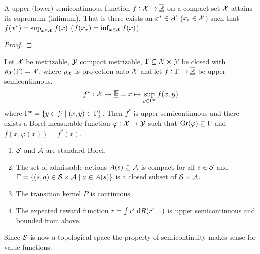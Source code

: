 \begin{prop}
  A upper (lower) semicontinuous function $f: \mathcal{X} \to \overline{\underline{\mathbb{R}}}$ on a compact
  set $\mathcal{X}$ attains its
  supremum (infimum). That is there exists an $x^* \in \mathcal{X}$ 
  ($x_* \in \mathcal{X}$) such that
  $f(x^*) = \sup_{x \in \mathcal{X}} f(x)$
  ($f(x_*) = \inf_{x \in \mathcal{X}} f(x)$).
  \label{prop:supSemiC}
\end{prop}
\begin{proof}
\end{proof}

\begin{prop}
  Let $\mathcal{X}$ be metrizable, $\mathcal{Y}$ compact metrizable,
  $\Gamma \subseteq \mathcal{X} \times \mathcal{Y}$ be closed with
  $\rho_\mathcal{X} (\Gamma) = \mathcal{X}$, where
  $\rho_\mathcal{X}$ is projection onto $\mathcal{X}$
  and let $f : \Gamma \to \overline{\underline{\mathbb{R}}}$ be upper semicontinuous.
  \[ f^* : \mathcal{X} \to \overline{\underline{\mathbb{R}}} = x \mapsto \sup_{y \in \Gamma^x} f(x, y) \]
  where $\Gamma^x = \{ y \in \mathcal{Y} \mid (x, y) \in \Gamma \}$.
  Then $f^*$ is upper semicontinuous and there exists a Borel-measurable
  function $\varphi : \mathcal{X} \to \mathcal{Y}$ such that
  $\mathrm{Gr}(\varphi) \subseteq \Gamma$ and
  $f(x, \varphi(x)) = f^*(x)$.
  \label{prop:measSel}
\end{prop}

\begin{sett}
  \leavevmode
  \begin{enumerate}
    \item $\mathcal{S}$ and $\mathcal{A}$ are standard Borel.
    \item The set of admissable actions 
      $A(s) \subseteq \mathcal{A}$ is compact for all $s \in \mathcal{S}$
      and $\Gamma = \{ (s, a) \in \mathcal{S} \times \mathcal{A} \mid a \in A(s) \}$
      is a closed subset of $\mathcal{S} \times \mathcal{A}$.
    \item The transition kernel $P$ is continuous.
    \item The expected reward function $r = \int r' \; \mathrm{d} R(r' \mid \cdot)$
      is upper semicontinuous and bounded from above.
  \end{enumerate}
  \label{sett:BS0}
\end{sett}

Since $\mathcal{S}$ is now a topological space the property of semicontinuity
makes sense for value functions.

